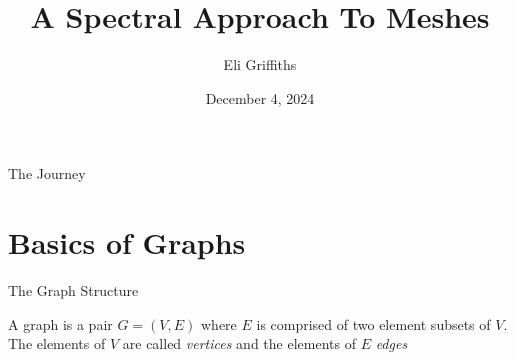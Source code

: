 \documentclass{beamer}
\author{Eli Griffiths}
\title{A Spectral Approach To Meshes}
\institute[UCI]{University of California, Irvine}
\date{December 4, 2024}
\begin{document}
\maketitle

\begin{frame}{The Journey}
    \tableofcontents
\end{frame}

\section{Basics of Graphs}

\begin{frame}{The Graph Structure}
    \begin{definition}[Graph]
        A graph is a pair $G = (V, E)$ where $E$ is comprised of two element subsets of $V$. The elements of $V$ are called \emph{vertices} and the elements of $E$ \emph{edges}
    \end{definition}
    \pause
    \begin{center}
    \end{center}
\end{frame}
\end{document}
